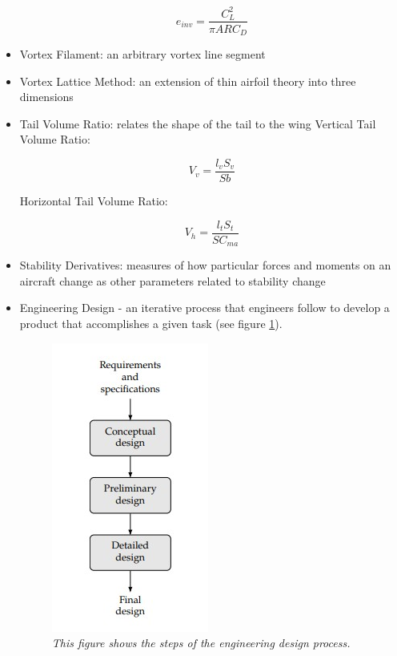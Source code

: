 \documentclass{journal}
\begin{document}
\begin{itemize}
		\begin{equation}
			e_{inv} = \frac{C_L^2}{\pi{ARC_D}}
			\label{eqn:efficiency-wiki}
		\end{equation}
		
		\item Vortex Filament: an arbitrary vortex line segment
		\item Vortex Lattice Method: an extension of thin airfoil theory into three dimensions
		\item Tail Volume Ratio: relates the shape of the tail to the wing 
		\subitem Vertical Tail Volume Ratio: 
		
		\begin{equation}
			V_v = \frac{l_vS_v}{Sb}
			\label{eqn:vtail-ratio-wiki}
		\end{equation}
		
		\subitem Horizontal Tail Volume Ratio:
		
		\begin{equation}
			V_h = \frac{l_tS_t}{SC_{ma}}
			\label{eqn:htail-ratio-wiki}
		\end{equation}
		
		\item Stability Derivatives: measures of how particular forces and moments on an aircraft change as other parameters related to stability change
		
		\item Engineering Design - an iterative process that engineers follow to
		develop a product that accomplishes a given task (see figure \ref{fig:design-process}).
		
		\begin{figure}[H]
			\centering
			\includegraphics[scale=0.75]{../graphics/design_process}
			\caption{\emph{This figure shows the steps of the engineering design process.}}
			\label{fig:design-process}
		\end{figure}
		

\end{itemize}
\end{document}
